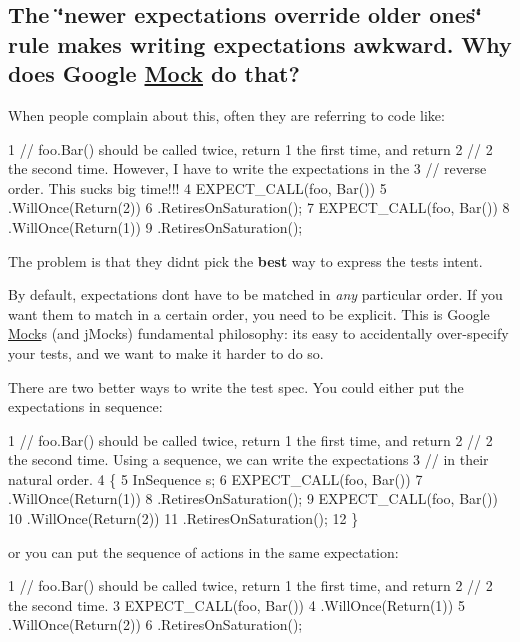 \subsection*{The \char`\"{}newer expectations override older ones\char`\"{} rule makes writing expectations awkward. Why does Google \hyperlink{classMock}{Mock} do that?}

When people complain about this, often they are referring to code like\+:


\begin{DoxyCode}
1 // foo.Bar() should be called twice, return 1 the first time, and return
2 // 2 the second time.  However, I have to write the expectations in the
3 // reverse order.  This sucks big time!!!
4 EXPECT\_CALL(foo, Bar())
5     .WillOnce(Return(2))
6     .RetiresOnSaturation();
7 EXPECT\_CALL(foo, Bar())
8     .WillOnce(Return(1))
9     .RetiresOnSaturation();
\end{DoxyCode}


The problem is that they didn\textquotesingle{}t pick the {\bfseries best} way to express the test\textquotesingle{}s intent.

By default, expectations don\textquotesingle{}t have to be matched in {\itshape any} particular order. If you want them to match in a certain order, you need to be explicit. This is Google \hyperlink{classMock}{Mock}\textquotesingle{}s (and j\+Mock\textquotesingle{}s) fundamental philosophy\+: it\textquotesingle{}s easy to accidentally over-\/specify your tests, and we want to make it harder to do so.

There are two better ways to write the test spec. You could either put the expectations in sequence\+:


\begin{DoxyCode}
1 // foo.Bar() should be called twice, return 1 the first time, and return
2 // 2 the second time.  Using a sequence, we can write the expectations
3 // in their natural order.
4 \{
5   InSequence s;
6   EXPECT\_CALL(foo, Bar())
7       .WillOnce(Return(1))
8       .RetiresOnSaturation();
9   EXPECT\_CALL(foo, Bar())
10       .WillOnce(Return(2))
11       .RetiresOnSaturation();
12 \}
\end{DoxyCode}


or you can put the sequence of actions in the same expectation\+:


\begin{DoxyCode}
1 // foo.Bar() should be called twice, return 1 the first time, and return
2 // 2 the second time.
3 EXPECT\_CALL(foo, Bar())
4     .WillOnce(Return(1))
5     .WillOnce(Return(2))
6     .RetiresOnSaturation();
\end{DoxyCode}


